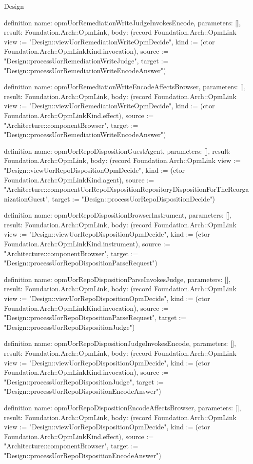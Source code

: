 \begin{lexlean}{Design}
\begin{semanticmodule}
definition{
  name: opmUorRemediationWriteJudgeInvokesEncode,
  parameters: [],
  result: Foundation.Arch::OpmLink,
  body: (record Foundation.Arch::OpmLink {view := "Design::viewUorRemediationWriteOpmDecide", kind := (ctor Foundation.Arch::OpmLinkKind.invocation), source := "Design::processUorRemediationWriteJudge", target := "Design::processUorRemediationWriteEncodeAnswer"})
}

definition{
  name: opmUorRemediationWriteEncodeAffectsBrowser,
  parameters: [],
  result: Foundation.Arch::OpmLink,
  body: (record Foundation.Arch::OpmLink {view := "Design::viewUorRemediationWriteOpmDecide", kind := (ctor Foundation.Arch::OpmLinkKind.effect), source := "Architecture::componentBrowser", target := "Design::processUorRemediationWriteEncodeAnswer"})
}

definition{
  name: opmUorRepoDispositionGuestAgent,
  parameters: [],
  result: Foundation.Arch::OpmLink,
  body: (record Foundation.Arch::OpmLink {view := "Design::viewUorRepoDispositionOpmDecide", kind := (ctor Foundation.Arch::OpmLinkKind.agent), source := "Architecture::componentUorRepoDispositionRepositoryDispositionForTheReorganizationGuest", target := "Design::processUorRepoDispositionDecide"})
}

definition{
  name: opmUorRepoDispositionBrowserInstrument,
  parameters: [],
  result: Foundation.Arch::OpmLink,
  body: (record Foundation.Arch::OpmLink {view := "Design::viewUorRepoDispositionOpmDecide", kind := (ctor Foundation.Arch::OpmLinkKind.instrument), source := "Architecture::componentBrowser", target := "Design::processUorRepoDispositionParseRequest"})
}

definition{
  name: opmUorRepoDispositionParseInvokesJudge,
  parameters: [],
  result: Foundation.Arch::OpmLink,
  body: (record Foundation.Arch::OpmLink {view := "Design::viewUorRepoDispositionOpmDecide", kind := (ctor Foundation.Arch::OpmLinkKind.invocation), source := "Design::processUorRepoDispositionParseRequest", target := "Design::processUorRepoDispositionJudge"})
}

definition{
  name: opmUorRepoDispositionJudgeInvokesEncode,
  parameters: [],
  result: Foundation.Arch::OpmLink,
  body: (record Foundation.Arch::OpmLink {view := "Design::viewUorRepoDispositionOpmDecide", kind := (ctor Foundation.Arch::OpmLinkKind.invocation), source := "Design::processUorRepoDispositionJudge", target := "Design::processUorRepoDispositionEncodeAnswer"})
}

definition{
  name: opmUorRepoDispositionEncodeAffectsBrowser,
  parameters: [],
  result: Foundation.Arch::OpmLink,
  body: (record Foundation.Arch::OpmLink {view := "Design::viewUorRepoDispositionOpmDecide", kind := (ctor Foundation.Arch::OpmLinkKind.effect), source := "Architecture::componentBrowser", target := "Design::processUorRepoDispositionEncodeAnswer"})
}


\end{semanticmodule}
\end{lexlean}
